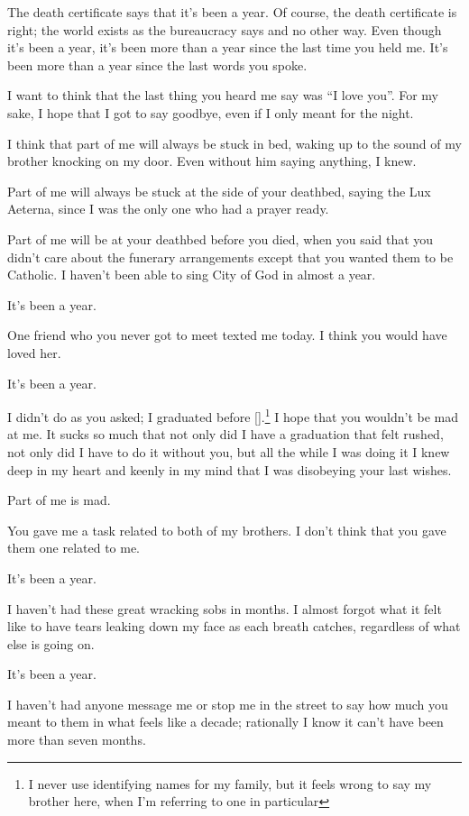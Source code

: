 \documentclass[12pt]{article}
\newcommand{\say}[1]{``#1''}
\renewcommand{\,}{\textsuperscript{,}}
\begin{document}
The death certificate says that it's been a year.  
Of course, the death certificate is right; the world exists as the bureaucracy says and no other way.  
Even though it's been a year, it's been more than a year since the last time you held me.  
It's been more than a year since the last words you spoke.

I want to think that the last thing you heard me say was \say{I love you}.  
For my sake, I hope that I got to say goodbye, even if I only meant for the night.

I think that part of me will always be stuck in bed, waking up to the sound of my brother knocking on my door.  
Even without him saying anything, I knew.

Part of me will always be stuck at the side of your deathbed, saying the Lux Aeterna, since I was the only one who had a prayer ready.

Part of me will be at your deathbed before you died, when you said that you didn't care about the funerary arrangements except that you wanted them to be Catholic.  
I haven't been able to sing City of God in almost a year.

It's been a year.

One friend who you never got to meet texted me today.  
I think you would have loved her.

It's been a year.

I didn't do as you asked; I graduated before [].\footnote{I never use identifying names for my family, but it feels wrong to say my brother here, when I'm referring to one in particular}  
I hope that you wouldn't be mad at me.  
It sucks so much that not only did I have a graduation that felt rushed, not only did I have to do it without you, but all the while I was doing it I knew deep in my heart and keenly in my mind that I was disobeying your last wishes.

Part of me is mad.

You gave me a task related to both of my brothers.  
I don't think that you gave them one related to me.

It's been a year.

I haven't had these great wracking sobs in months.  
I almost forgot what it felt like to have tears leaking down my face as each breath catches, regardless of what else is going on.

It's been a year.

I haven't had anyone message me or stop me in the street to say how much you meant to them in what feels like a decade; rationally I know it can't have been more than seven months.
\end{document}
